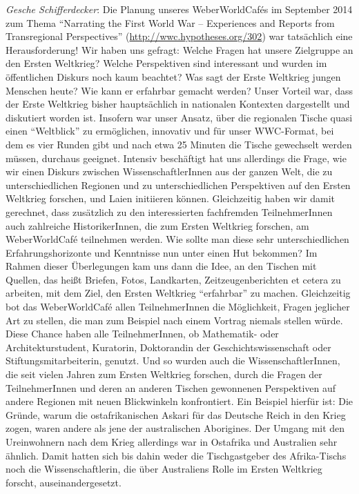 \documentclass[a4paper,
fontsize=11pt,
oneside,
numbers=noperiodatend,
parskip=half-,
bibliography=totoc,
final
]{scrartcl}
\begin{document}
\emph{Gesche Schifferdecker}: Die Planung unseres WeberWorldCafés im
September 2014 zum Thema \enquote{Narrating the First World War --
Experiences and Reports from Transregional Perspectives}
(\url{http://wwc.hypotheses.org/302}) war tatsächlich eine
Herausforderung! Wir haben uns gefragt: Welche Fragen hat unsere
Zielgruppe an den Ersten Weltkrieg? Welche Perspektiven sind interessant
und wurden im öffentlichen Diskurs noch kaum beachtet? Was sagt der
Erste Weltkrieg jungen Menschen heute? Wie kann er erfahrbar gemacht
werden? Unser Vorteil war, dass der Erste Weltkrieg bisher hauptsächlich
in nationalen Kontexten dargestellt und diskutiert worden ist. Insofern
war unser Ansatz, über die regionalen Tische quasi einen
\enquote{Weltblick} zu ermöglichen, innovativ und für unser WWC-Format,
bei dem es vier Runden gibt und nach etwa 25 Minuten die Tische
gewechselt werden müssen, durchaus geeignet. Intensiv beschäftigt hat
uns allerdings die Frage, wie wir einen Diskurs zwischen
WissenschaftlerInnen aus der ganzen Welt, die zu unterschiedlichen
Regionen und zu unterschiedlichen Perspektiven auf den Ersten Weltkrieg
forschen, und Laien initiieren können. Gleichzeitig haben wir damit
gerechnet, dass zusätzlich zu den interessierten fachfremden
TeilnehmerInnen auch zahlreiche HistorikerInnen, die zum Ersten
Weltkrieg forschen, am WeberWorldCafé teilnehmen werden. Wie sollte man
diese sehr unterschiedlichen Erfahrungshorizonte und Kenntnisse nun
unter einen Hut bekommen? Im Rahmen dieser Überlegungen kam uns dann die
Idee, an den Tischen mit Quellen, das heißt Briefen, Fotos, Landkarten,
Zeitzeugenberichten et cetera zu arbeiten, mit dem Ziel, den Ersten
Weltkrieg \enquote{erfahrbar} zu machen. Gleichzeitig bot das
WeberWorldCafé allen TeilnehmerInnen die Möglichkeit, Fragen jeglicher
Art zu stellen, die man zum Beispiel nach einem Vortrag niemals stellen
würde. Diese Chance haben alle TeilnehmerInnen, ob Mathematik- oder
Architekturstudent, Kuratorin, Doktorandin der Geschichtswissenschaft
oder Stiftungsmitarbeiterin, genutzt. Und so wurden auch die
WissenschaftlerInnen, die seit vielen Jahren zum Ersten Weltkrieg
forschen, durch die Fragen der TeilnehmerInnen und deren an anderen
Tischen gewonnenen Perspektiven auf andere Regionen mit neuen
Blickwinkeln konfrontiert. Ein Beispiel hierfür ist: Die Gründe, warum
die ostafrikanischen Askari für das Deutsche Reich in den Krieg zogen,
waren andere als jene der australischen Aborigines. Der Umgang mit den
Ureinwohnern nach dem Krieg allerdings war in Ostafrika und Australien
sehr ähnlich. Damit hatten sich bis dahin weder die Tischgastgeber des
Afrika-Tischs noch die Wissenschaftlerin, die über Australiens Rolle im
Ersten Weltkrieg forscht, auseinandergesetzt.
\end{document}
